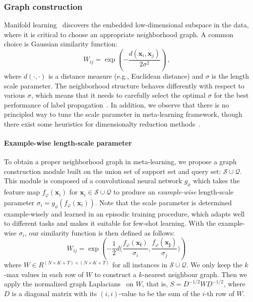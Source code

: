 \documentclass{article} \usepackage{iclr2019_conference,times}
\def\bfx{\mathbf{x}}
\begin{document}
\subsubsection{Graph construction}
\label{graph}

Manifold learning~\citep{spectral,labelprop1,revisiting} discovers the embedded low-dimensional
subspace in the data, where it is critical to choose an appropriate neighborhood graph.
A common choice is Gaussian similarity function:
\begin{equation}
\label{weight}
W_{ij} = \exp\left(-\frac{d(\bfx_i, \bfx_j)}{2\sigma^2}\right)\,,
\end{equation}
where $d(\cdot, \cdot)$ is a distance measure (e.g., Euclidean distance) and $\sigma$ is the length scale parameter. The neighborhood structure behaves differently with respect to various $\sigma$,
which means that it needs to carefully select the optimal $\sigma$ for the best
performance of label propagation~\citep{labelprop2,labelprop3}.
In addition, we observe that there is no principled way to tune the scale
parameter in meta-learning framework, though there exist some heuristics for 
dimensionalty reduction methods~\citep{localscaling,lfda}.



\paragraph{Example-wise length-scale parameter} To obtain a proper neighborhood graph in meta-learning, we propose a graph construction module built on the union set of support set and query set: $\mathcal{S}\cup \mathcal{Q}$. 
This module is composed of a convolutional neural network $g_{\phi}$ which takes the 
feature map $f_{\varphi}(\bfx_i)$ for $\bfx_i \in \mathcal{S}\cup \mathcal{Q}$ to produce an \emph{example-wise} length-scale parameter 
$\sigma_i = g_{\phi}(f_{\varphi}(\bfx_i))$. Note that the scale parameter is determined example-wisely and 
learned in an episodic training procedure, which adapts well to different tasks and makes it suitable for few-shot learning. With the example-wise $\sigma_i$, our similarity function is then defined as follows:
\begin{equation}
W_{ij} = \exp\left(-\frac{1}{2}d\Big(\frac{f_{\varphi}(\mathbf{x_i})}{\sigma_i},\frac{f_{\varphi}(\mathbf{x_j})}{\sigma_j}\Big) \right)\,
\end{equation}
where $W \in R^{(N\times K + T)\times(N\times K + T)}$ for all instances in $\mathcal{S}\cup \mathcal{Q}$. We only keep the $k$-max values in each row of $W$ to construct a $k$-nearest neighbour graph. Then we apply the normalized graph Laplacians~\citep{spectral} on $W$, that is,  $S=D^{-1/2}WD^{-1/2}$, where 
$D$ is a diagonal matrix with its $(i,i)$-value to be the sum of the $i$-th row of $W$. 
\end{document}
